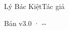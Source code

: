 \begin{titlepage}
\vfill
{\LARGE\sffamily Lý Bác Kiệt\quad Tác giả\par}
\vspace{0.7cm}
{\small\sffamily\color{structurecolor!80} Bản v3.0 · \number\year-\number\month-\number\day\par}
\vspace{1.2cm}
\end{titlepage}
